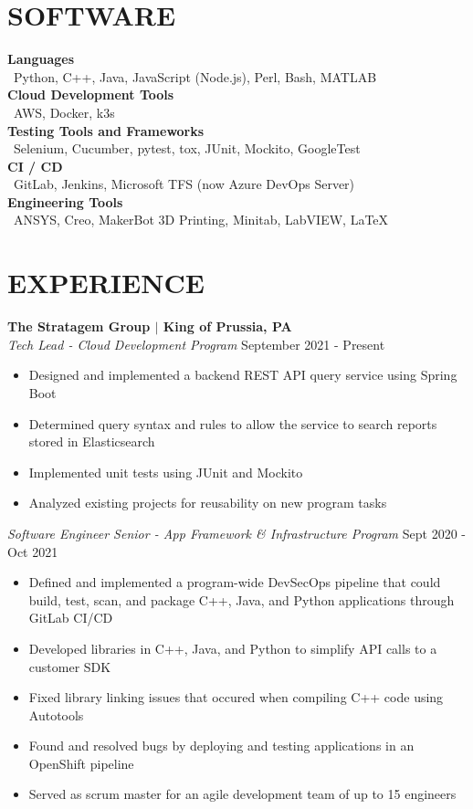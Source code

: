 \documentclass[line,resmargin,11pt]{res}
\begin{document}
\begin{resume}
\section{SOFTWARE}
\textbf{Languages} \\
\textbullet\ Python, C++, Java, JavaScript (Node.js), Perl, Bash, MATLAB  \\
\textbf{Cloud Development Tools} \\
\textbullet\ AWS, Docker, k3s \\
\textbf{Testing Tools and Frameworks} \\
\textbullet\ Selenium, Cucumber, pytest, tox, JUnit, Mockito, GoogleTest \\
\textbf{CI / CD} \\
\textbullet\ GitLab, Jenkins, Microsoft TFS (now Azure DevOps Server) \\
\textbf{Engineering Tools} \\
\textbullet\ ANSYS, Creo, MakerBot 3D Printing, Minitab, LabVIEW, \LaTeX        
 
\section{EXPERIENCE}
\textbf{The Stratagem Group $|$ King of Prussia, PA} \\
{\sl Tech Lead - Cloud Development Program} \hfill September 2021 - Present
	\begin{itemize} \itemsep -2pt %
        \item Designed and implemented a backend REST API query service using Spring Boot
        \item Determined query syntax and rules to allow the service to search reports stored in Elasticsearch
        \item Implemented unit tests using JUnit and Mockito
		\item Analyzed existing projects for reusability on new program tasks
	\end{itemize}

{\sl Software Engineer Senior - App Framework \& Infrastructure Program} \hfill Sept 2020 - Oct 2021
	\begin{itemize} \itemsep -2pt
		\item Defined and implemented a program-wide DevSecOps pipeline that could build, test, scan, and package C++, Java, and Python applications through GitLab CI/CD
		\item Developed libraries in C++, Java, and Python to simplify API calls to a customer SDK
		\item Fixed library linking issues that occured when compiling C++ code using Autotools
		\item Found and resolved bugs by deploying and testing applications in an OpenShift pipeline
		\item Served as scrum master for an agile development team of up to 15 engineers
	\end{itemize}


\end{resume}
\end{document}
